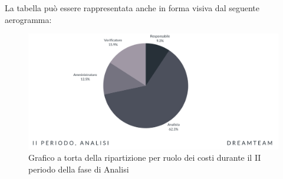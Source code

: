 La tabella può essere rappresentata anche in forma visiva dal seguente aerogramma:

\begin{figure}[H]
\centering
\includegraphics[scale=0.65]{Sezioni/SezioniPreventivo/grafici/Analisi_II_periodo_costi.png}
\caption{Grafico a torta della ripartizione per ruolo dei costi durante il II periodo della fase di Analisi}
\end{figure}



